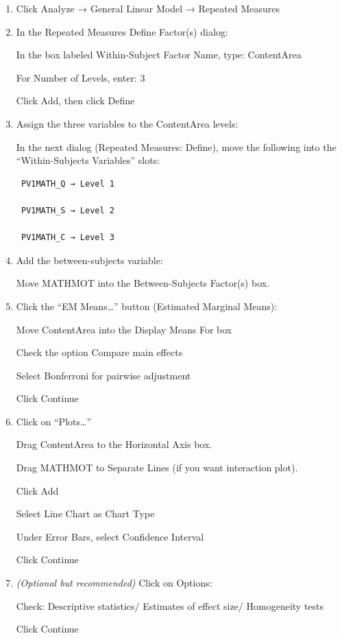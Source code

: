 \documentclass[
  letterpaper,
  DIV=11,
  numbers=noendperiod]{scrreprt}
\begin{document}
\begin{enumerate}
\def\labelenumi{\arabic{enumi}.}
\item
  Click Analyze → General Linear Model → Repeated Measures
\item
  In the Repeated Measures Define Factor(s) dialog:

  In the box labeled Within-Subject Factor Name, type: ContentArea

  For Number of Levels, enter: 3

  Click Add, then click Define
\item
  Assign the three variables to the ContentArea levels:

  In the next dialog (Repeated Measures: Define), move the following
  into the ``Within-Subjects Variables'' slots:

\begin{verbatim}
 PV1MATH_Q → Level 1 

 PV1MATH_S → Level 2 

 PV1MATH_C → Level 3 
\end{verbatim}
\item
  Add the between-subjects variable:

  Move MATHMOT into the Between-Subjects Factor(s) box.
\item
  Click the ``EM Means\ldots{}'' button (Estimated Marginal Means):

  Move ContentArea into the Display Means For box

  Check the option Compare main effects

  Select Bonferroni for pairwise adjustment

  Click Continue
\item
  Click on ``Plots\ldots{}''

  Drag ContentArea to the Horizontal Axis box.

  Drag MATHMOT to Separate Lines (if you want interaction plot).

  Click Add

  Select Line Chart as Chart Type

  Under Error Bars, select Confidence Interval

  Click Continue
\item
  \emph{(Optional but recommended)} Click on Options:

  Check: Descriptive statistics/ Estimates of effect size/ Homogeneity
  tests

  Click Continue
\end{enumerate}
\end{document}
